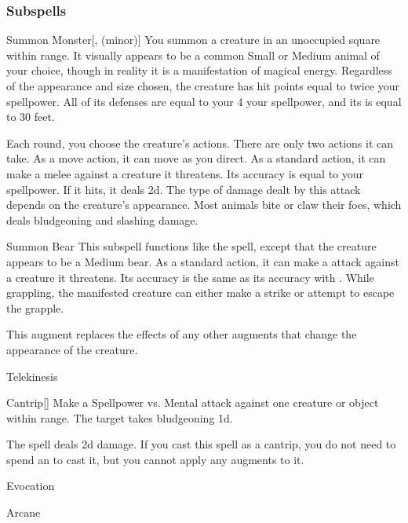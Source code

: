 \subsubsection{Subspells}


\begin{ability}[\nth{1}]{Summon Monster}[,  (minor)]
You summon a creature in an unoccupied square within \rngmed range.
It visually appears to be a common Small or Medium animal of your choice, though in reality it is a manifestation of magical energy.
Regardless of the appearance and size chosen, the creature has hit points equal to twice your spellpower.
All of its defenses are equal to your 4 \add your spellpower, and its  is equal to 30 feet.

Each round, you choose the creature's actions.
There are only two actions it can take.
As a move action, it can move as you direct.
As a standard action, it can make a melee  against a creature it threatens.
Its accuracy is equal to your spellpower.
If it hits, it deals  \minus2d.
The type of damage dealt by this attack depends on the creature's appearance.
Most animals bite or claw their foes, which deals bludgeoning and slashing damage.
\end{ability}
\vspace{0.25em}


\begin{ability}[\nth{2}]{Summon Bear}
This subspell functions like the  spell, except that the creature appears to be a Medium bear.
As a standard action, it can make a  attack against a creature it threatens.
Its accuracy is the same as its accuracy with .
While grappling, the manifested creature can either make a strike or attempt to escape the grapple.

This augment replaces the effects of any other augments that change the appearance of the creature.
\end{ability}
\vspace{0.25em}

\newpage
\begin{spellsection}{Telekinesis}

\begin{spellheader}
\end{spellheader}


\begin{ability}{Cantrip}[]
Make a Spellpower vs. Mental attack against one creature or object within \rngmed range.
\hit The target takes bludgeoning  \minus1d.
\end{ability}



 The spell deals \minus2d damage. If you cast this spell as a cantrip,
you do not need to spend an  to cast it,
but you cannot apply any augments to it.


 Evocation

 Arcane
\end{spellsection}


